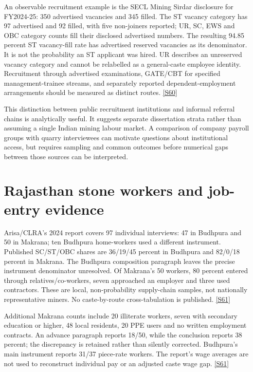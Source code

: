 \documentclass[11pt,a4paper]{report}
\begin{document}
An observable recruitment example is the SECL Mining Sirdar disclosure for FY2024-25: 350 advertised vacancies and 345 filled. The ST vacancy category has 97 advertised and 92 filled, with five non-joiners reported; UR, SC, EWS and OBC category counts fill their disclosed advertised numbers. The resulting 94.85 percent ST vacancy-fill rate has advertised reserved vacancies as its denominator. It is not the probability an ST applicant was hired. UR describes an unreserved vacancy category and cannot be relabelled as a general-caste employee identity. Recruitment through advertised examinations, GATE/\allowbreak{}CBT for specified management-trainee streams, and separately reported dependent-employment arrangements should be measured as distinct routes. \hyperlink{S60}{[S60]}

This distinction between public recruitment institutions and informal referral chains is analytically useful. It suggests separate dissertation strata rather than assuming a single Indian mining labour market. A comparison of company payroll groups with quarry interviewees can motivate questions about institutional access, but requires sampling and common outcomes before numerical gaps between those sources can be interpreted.

\section{Rajasthan stone workers and job-entry evidence}
Arisa/\allowbreak{}CLRA's 2024 report covers 97 individual interviews: 47 in Budhpura and 50 in Makrana; ten Budhpura home-workers used a different instrument. Published SC/\allowbreak{}ST/\allowbreak{}OBC shares are 36/\allowbreak{}19/\allowbreak{}45 percent in Budhpura and 82/\allowbreak{}0/\allowbreak{}18 percent in Makrana. The Budhpura composition paragraph leaves the precise instrument denominator unresolved. Of Makrana's 50 workers, 80 percent entered through relatives/\allowbreak{}co-workers, seven approached an employer and three used contractors. These are local, non-probability supply-chain samples, not nationally representative miners. No caste-by-route cross-tabulation is published. \hyperlink{S61}{[S61]}

Additional Makrana counts include 20 illiterate workers, seven with secondary education or higher, 48 local residents, 20 PPE users and no written employment contracts. An advance paragraph reports 18/\allowbreak{}50, while the conclusion reports 38 percent; the discrepancy is retained rather than silently corrected. Budhpura's main instrument reports 31/\allowbreak{}37 piece-rate workers. The report's wage averages are not used to reconstruct individual pay or an adjusted caste wage gap. \hyperlink{S61}{[S61]}
\end{document}
